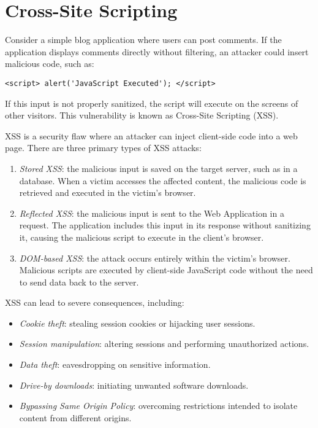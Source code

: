 \section{Cross-Site Scripting}

Consider a simple blog application where users can post comments. 
If the application displays comments directly without filtering, an attacker could insert malicious code, such as:
\begin{verbatim}
<script> alert('JavaScript Executed'); </script>
\end{verbatim}
If this input is not properly sanitized, the script will execute on the screens of other visitors. 
This vulnerability is known as Cross-Site Scripting (XSS).

XSS is a security flaw where an attacker can inject client-side code into a web page. 
There are three primary types of XSS attacks:
\begin{enumerate}
    \item \textit{Stored XSS}: the malicious input is saved on the target server, such as in a database. 
        When a victim accesses the affected content, the malicious code is retrieved and executed in the victim's browser.
    \item \textit{Reflected XSS}: the malicious input is sent to the Web Application in a request. 
        The application includes this input in its response without sanitizing it, causing the malicious script to execute in the client's browser.
    \item \textit{DOM-based XSS}: the attack occurs entirely within the victim's browser. 
        Malicious scripts are executed by client-side JavaScript code without the need to send data back to the server.
\end{enumerate}
XSS can lead to severe consequences, including:
\begin{itemize}
    \item \textit{Cookie theft}: stealing session cookies or hijacking user sessions.
    \item \textit{Session manipulation}: altering sessions and performing unauthorized actions.
    \item \textit{Data theft}: eavesdropping on sensitive information.
    \item \textit{Drive-by downloads}: initiating unwanted software downloads.
    \item \textit{Bypassing Same Origin Policy}: overcoming restrictions intended to isolate content from different origins.
\end{itemize}

